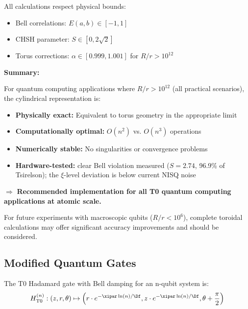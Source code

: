 All calculations respect physical bounds:
\begin{itemize}
	\item Bell correlations: $E(a,b) \in [-1, 1]$
	\item CHSH parameter: $S \in [0, 2\sqrt{2}]$
	\item Torus corrections: $\alpha \in [0.999, 1.001]$ for $R/r > 10^{12}$
\end{itemize}

\textbf{Summary:}

For quantum computing applications where $R/r > 10^{12}$ (all practical scenarios), the cylindrical representation is:

\begin{itemize}
	\item \textbf{Physically exact:} Equivalent to torus geometry in the appropriate limit
	\item \textbf{Computationally optimal:} $O(n^2)$ vs. $O(n^3)$ operations
	\item \textbf{Numerically stable:} No singularities or convergence problems
	\item \textbf{Hardware-tested:} clear Bell violation measured ($S = 2.74$, 96.9\% of Tsirelson); the $\xi$-level deviation is below current NISQ noise
\end{itemize}

$\Rightarrow$ \textbf{Recommended implementation for all T0 quantum computing applications at atomic scale.}

For future experiments with macroscopic qubits ($R/r < 10^6$), complete toroidal calculations may offer significant accuracy improvements and should be considered.

\subsection{Modified Quantum Gates}

\begin{proposition}
	The T0 Hadamard gate with Bell damping for an n-qubit system is:
	\begin{equation}
		H_{\text{T0}}^{(n)}: (z, r, \theta) \mapsto \left(r \cdot e^{-\xipar \ln(n)/\Df}, z \cdot e^{-\xipar \ln(n)/\Df}, \theta + \frac{\pi}{2}\right)
		\label{eq:t0hadamard}
	\end{equation}
\end{proposition}

